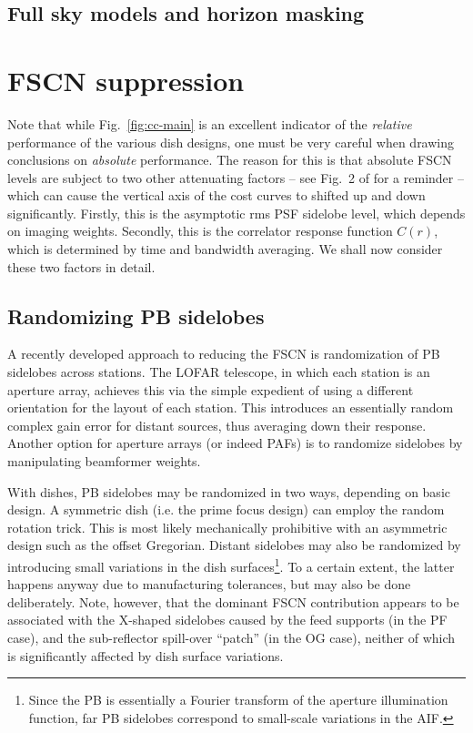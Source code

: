 \documentclass{aa}
\begin{document}
\subsection{Full sky models and horizon masking}
\label{sec:horizon-masking}




\section{FSCN suppression}

Note that while Fig.~\ref{fig:cc-main} is an excellent indicator of the \emph{relative} performance of the various dish designs, one must be very careful when drawing conclusions on \emph{absolute} performance. The reason for this is that absolute FSCN levels are subject to two other attenuating factors -- see Fig.~2 of \citet{SKA54-expa,SKA54} for a reminder -- which can cause the vertical axis of the cost curves to shifted up and down significantly. Firstly, this is the asymptotic rms PSF sidelobe level, which depends on imaging weights. Secondly, this is the correlator response function $C(r)$, which is determined by time and bandwidth averaging. We shall now consider these two factors in detail.

\subsection{Randomizing PB sidelobes}
\label{sec:randomizing}

A recently developed approach to reducing the FSCN is randomization of PB sidelobes across stations. The LOFAR telescope, in which each station is an aperture array, achieves this via the simple expedient of using a different orientation for the layout of each station. This introduces an essentially random complex gain error for distant sources, thus averaging down their response. Another option for aperture arrays (or indeed PAFs) is to randomize sidelobes by manipulating beamformer weights.

With dishes, PB sidelobes may be randomized in two ways, depending on basic design. A symmetric dish (i.e. the prime focus design) can employ the random rotation trick. This is most likely mechanically prohibitive with an asymmetric design such as the offset Gregorian. Distant sidelobes may also be randomized by introducing small variations in the dish surfaces\footnote{Since the PB is essentially a Fourier transform of the aperture illumination function, far PB sidelobes correspond to small-scale variations in the AIF.}. To a certain extent, the latter happens anyway due to manufacturing tolerances, but may also be done deliberately. Note, however, that the dominant FSCN contribution appears to be associated with the X-shaped sidelobes caused by the feed supports (in the PF case), and the sub-reflector spill-over ``patch'' (in the OG case), neither of which is significantly affected by dish surface variations.
\end{document}
